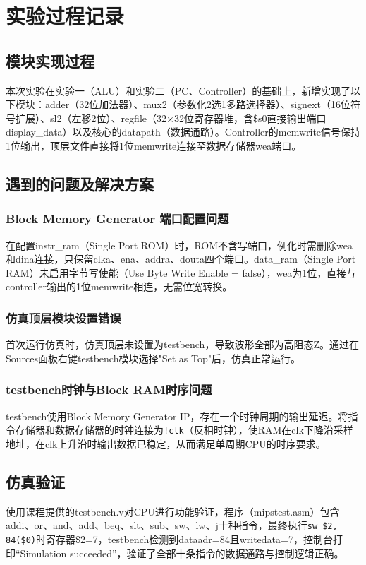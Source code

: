 \section{实验过程记录}

\subsection{模块实现过程}
本次实验在实验一（ALU）和实验二（PC、Controller）的基础上，新增实现了以下模块：adder（32位加法器）、mux2（参数化2选1多路选择器）、signext（16位符号扩展）、sl2（左移2位）、regfile（32×32位寄存器堆，含\$s0直接输出端口display\_data）以及核心的datapath（数据通路）。Controller的memwrite信号保持1位输出，顶层文件直接将1位memwrite连接至数据存储器wea端口。

\subsection{遇到的问题及解决方案}

\subsubsection{Block Memory Generator 端口配置问题}
在配置instr\_ram（Single Port ROM）时，ROM不含写端口，例化时需删除wea和dina连接，只保留clka、ena、addra、douta四个端口。data\_ram（Single Port RAM）未启用字节写使能（Use Byte Write Enable = false），wea为1位，直接与controller输出的1位memwrite相连，无需位宽转换。

\subsubsection{仿真顶层模块设置错误}
首次运行仿真时，仿真顶层未设置为testbench，导致波形全部为高阻态Z。通过在Sources面板右键testbench模块选择"Set as Top"后，仿真正常运行。

\subsubsection{testbench时钟与Block RAM时序问题}
testbench使用Block Memory Generator IP，存在一个时钟周期的输出延迟。将指令存储器和数据存储器的时钟连接为\texttt{!clk}（反相时钟），使RAM在clk下降沿采样地址，在clk上升沿时输出数据已稳定，从而满足单周期CPU的时序要求。

\subsection{仿真验证}
使用课程提供的testbench.v对CPU进行功能验证，程序（mipstest.asm）包含addi、or、and、add、beq、slt、sub、sw、lw、j十种指令，最终执行\texttt{sw \$2, 84(\$0)}时寄存器\$2=7，testbench检测到dataadr=84且writedata=7，控制台打印``Simulation succeeded''，验证了全部十条指令的数据通路与控制逻辑正确。
